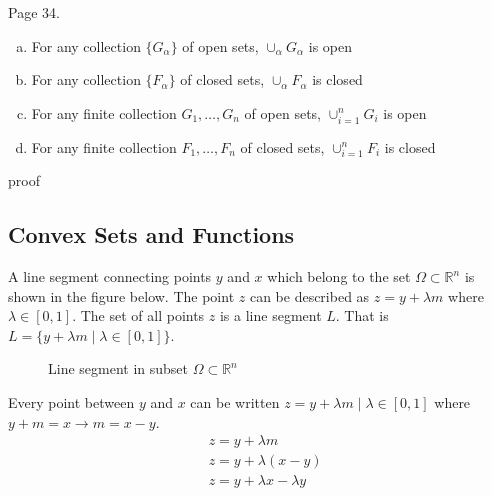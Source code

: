 \begin{thm-dan}[2.24]
  Page 34.
  \begin{enumerate}[(a)]
    \item{For any collection $\{G_{\alpha}\}$ of open sets, $\cup_{\alpha}G_{\alpha}$ is open}
    \item{For any collection $\{F_{\alpha}\}$ of closed sets, $\cup_{\alpha}F_{\alpha}$ is closed}
    \item{For any finite collection $G_{1},\dots,G_{n}$ of open sets, $\cup_{i=1}^{n}G_{i}$ is open}
    \item{For any finite collection $F_{1},\dots,F_{n}$ of closed sets, $\cup_{i=1}^{n}F_{i}$ is closed}
  \end{enumerate}
\end{thm-dan}

\begin{proof-dan}
proof
\end{proof-dan}

\subsection{Convex Sets and Functions}

\begin{defn-dan}
  A line segment connecting points $y$ and $x$ which belong to the set $\Omega\subset\mathbb{R}^{n}$ is shown in the figure below.
  The point $z$ can be described as $z=y+\lambda m$ where $\lambda\in[0,1]$.
  The set of all points $z$ is a line segment $L$.
  That is $L=\{y+\lambda m\;|\;\lambda\in[0,1]\}$.
\end{defn-dan}

\begin{figure}[H]
  \begin{center}
    \caption{Line segment in subset $\Omega\subset\mathbb{R}^{n}$\label{real.label_fig_1}}
  \end{center}
\end{figure}

Every point between $y$ and $x$ can be written $z=y+\lambda m\;|\;\lambda\in[0,1]$ where $y+m=x\rightarrow m=x-y$.
\begin{align*}
  &z=y+\lambda m \\
  &z=y+\lambda (x-y) \\
  &z=y+\lambda x-\lambda y
\end{align*}

